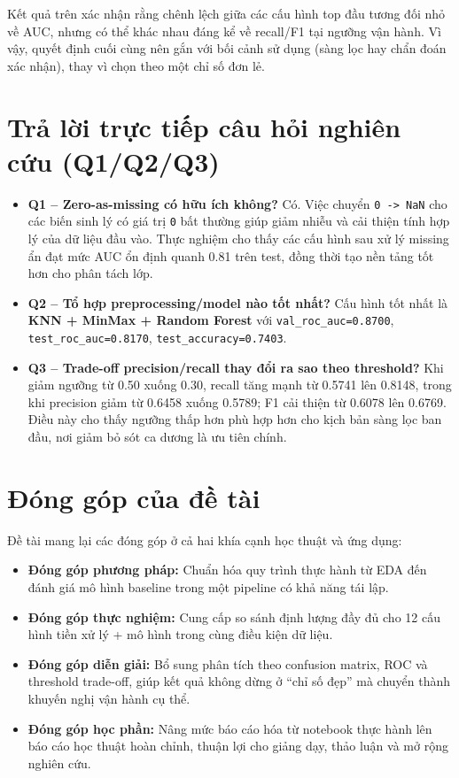 \noindent
Kết quả trên xác nhận rằng chênh lệch giữa các cấu hình top đầu tương đối nhỏ về AUC, nhưng có thể khác nhau đáng kể về recall/F1
tại ngưỡng vận hành. Vì vậy, quyết định cuối cùng nên gắn với bối cảnh sử dụng (sàng lọc hay chẩn đoán xác nhận), thay vì chọn theo một chỉ số đơn lẻ.

\section{Trả lời trực tiếp câu hỏi nghiên cứu (Q1/Q2/Q3)}
\begin{itemize}[leftmargin=1.5em]
    \item \textbf{Q1 -- Zero-as-missing có hữu ích không?}
    Có. Việc chuyển \texttt{0 -> NaN} cho các biến sinh lý có giá trị \texttt{0} bất thường giúp giảm nhiễu
    và cải thiện tính hợp lý của dữ liệu đầu vào. Thực nghiệm cho thấy các cấu hình sau xử lý missing ẩn đạt mức AUC
    ổn định quanh 0.81 trên test, đồng thời tạo nền tảng tốt hơn cho phân tách lớp.

    \item \textbf{Q2 -- Tổ hợp preprocessing/model nào tốt nhất?}
    Cấu hình tốt nhất là \textbf{KNN + MinMax + Random Forest} với
    \texttt{val\_roc\_auc=0.8700}, \texttt{test\_roc\_auc=0.8170}, \texttt{test\_accuracy=0.7403}.

    \item \textbf{Q3 -- Trade-off precision/recall thay đổi ra sao theo threshold?}
    Khi giảm ngưỡng từ 0.50 xuống 0.30, recall tăng mạnh từ 0.5741 lên 0.8148, trong khi precision
    giảm từ 0.6458 xuống 0.5789; F1 cải thiện từ 0.6078 lên 0.6769. Điều này cho thấy ngưỡng thấp hơn
    phù hợp hơn cho kịch bản sàng lọc ban đầu, nơi giảm bỏ sót ca dương là ưu tiên chính.
\end{itemize}

\section{Đóng góp của đề tài}
Đề tài mang lại các đóng góp ở cả hai khía cạnh học thuật và ứng dụng:
\begin{itemize}[leftmargin=1.5em]
    \item \textbf{Đóng góp phương pháp:} Chuẩn hóa quy trình thực hành từ EDA đến đánh giá mô hình baseline
    trong một pipeline có khả năng tái lập.

    \item \textbf{Đóng góp thực nghiệm:} Cung cấp so sánh định lượng đầy đủ cho 12 cấu hình tiền xử lý + mô hình
    trong cùng điều kiện dữ liệu.

    \item \textbf{Đóng góp diễn giải:} Bổ sung phân tích theo confusion matrix, ROC và threshold trade-off,
    giúp kết quả không dừng ở ``chỉ số đẹp'' mà chuyển thành khuyến nghị vận hành cụ thể.

    \item \textbf{Đóng góp học phần:} Nâng mức báo cáo hóa từ notebook thực hành lên báo cáo học thuật hoàn chỉnh,
    thuận lợi cho giảng dạy, thảo luận và mở rộng nghiên cứu.
\end{itemize}

